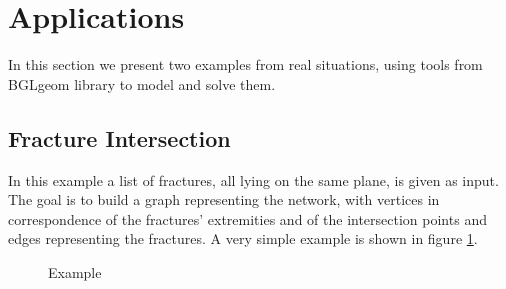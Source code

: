 \documentclass[10pt]{article} %
\begin{document}
	\section{Applications}
	In this section we present two examples from real situations, using tools from BGLgeom library to model and solve them.
	
	\subsection{Fracture Intersection}
	In this example a list of fractures, all lying on the same plane, is given as input. The goal is to build a graph representing the network, with vertices in correspondence of the fractures' extremities and of the intersection points  and edges representing the fractures. A very simple example is shown in figure \ref{fig:frac_int_example}.
	\begin{figure}
		\centering 
		\caption{Example}
		\label{fig:frac_int_example}
	\end{figure}
	
\end{document}
